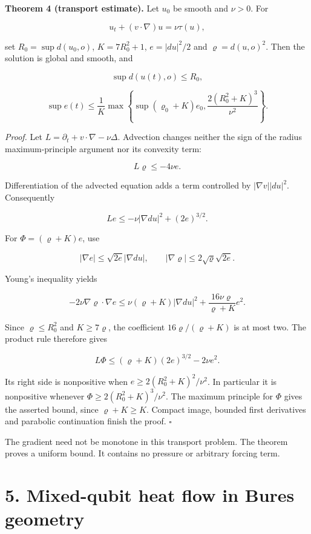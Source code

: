 \documentclass[
  11pt,
  a4paper,
]{article}
\begin{document}
\textbf{Theorem 4 (transport estimate).} Let \(u_0\) be smooth and \(\nu>0\). For

\[
u_t+(v\cdot\nabla)u=\nu\tau(u),
\]

set \(R_0=\sup d(u_0,o)\), \(K=7R_0^2+1\), \(e=|du|^2/2\) and \(\varrho=d(u,o)^2\). Then the solution is global and smooth, and

\[
\sup d(u(t),o)\leq R_0,
\]

\[
\sup e(t)\leq\frac1K\max\left\{
\sup(\varrho_0+K)e_0,
\frac{2(R_0^2+K)^3}{\nu^2}\right\}.
\]

\emph{Proof.} Let \(L=\partial_t+v\cdot\nabla-\nu\Delta\). Advection changes neither the sign of the radius maximum-principle argument nor its convexity term:

\[
L\varrho\leq-4\nu e.
\]

Differentiation of the advected equation adds a term controlled by \(|\nabla v||du|^2\). Consequently

\[
Le\leq-\nu|\nabla du|^2+(2e)^{3/2}.
\]

For \(\Phi=(\varrho+K)e\), use

\[
|\nabla e|\leq\sqrt{2e}|\nabla du|,
\qquad |\nabla\varrho|\leq2\sqrt\varrho\sqrt{2e}.
\]

Young's inequality yields

\[
-2\nu\nabla\varrho\cdot\nabla e
\leq\nu(\varrho+K)|\nabla du|^2
+\frac{16\nu\varrho}{\varrho+K}e^2.
\]

Since \(\varrho\leq R_0^2\) and \(K\geq7\varrho\), the coefficient \(16\varrho/(\varrho+K)\) is at most two. The product rule therefore gives

\[
L\Phi\leq(\varrho+K)(2e)^{3/2}-2\nu e^2.
\]

Its right side is nonpositive when \(e\geq2(R_0^2+K)^2/\nu^2\). In particular it is nonpositive whenever \(\Phi\geq2(R_0^2+K)^3/\nu^2\). The maximum principle for \(\Phi\) gives the asserted bound, since \(\varrho+K\geq K\). Compact image, bounded first derivatives and parabolic continuation finish the proof. \(\square\)

The gradient need not be monotone in this transport problem. The theorem proves a uniform bound. It contains no pressure or arbitrary forcing term.

\section{5. Mixed-qubit heat flow in Bures geometry}\label{mixed-qubit-heat-flow-in-bures-geometry}
\end{document}
